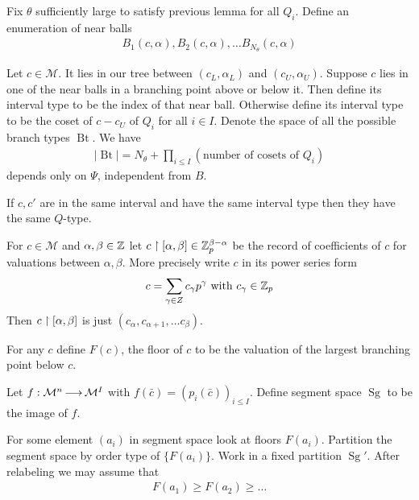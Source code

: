 \documentclass{amsart}
\newcommand{\M}{\mathcal M}
\newcommand{\paren}[1]{\left(#1\right)}
\DeclareMathOperator{\Sg}{Sg}
\DeclareMathOperator{\Bt}{Bt}
\begin{document}
\begin{Lemma}
	Fix $\theta$ sufficiently large to satisfy previous lemma for all $Q_i$. Define an enumeration of near balls
	\begin{align*}
		B_1(c, \alpha), B_2(c, \alpha), \ldots B_{N_\theta}(c, \alpha)
	\end{align*}
\end{Lemma}

\begin{Definition}
	Let $c \in \M$.
	It lies in our tree between $(c_L, \alpha_L)$ and $(c_U, \alpha_U)$.
	Suppose $c$ lies in one of the near balls in a branching point above or below it.
	Then define its interval type to be the index of that near ball.
	Otherwise define its interval type to be the coset of $c - c_U$ of $Q_i$ for all $i \in I$.
	Denote the space of all the possible branch types $\Bt$.
	We have
	\begin{align*}
		|\Bt| = N_\theta + \prod_{i \leq I} \paren{\text {number of cosets of $Q_i$}}
	\end{align*}
	depends only on $\Psi$, independent from $B$.
	
\end{Definition}

\begin{Lemma}
	If $c, c'$ are in the same interval and have the same interval type then they have the same $Q$-type.
\end{Lemma}

\begin{Definition}
	For $c \in \M$ and $\alpha, \beta \in \mathbb{Z}$ let $c \upharpoonright [\alpha, \beta] \in \mathbb{Z}_p^{\beta - \alpha}$ be the record of coefficients of $c$ for valuations between $\alpha, \beta$. More precisely write $c$ in its power series form
	\begin{align*}
		c = \sum_{\gamma \in Z} c_\gamma p^\gamma \text{ with } c_\gamma \in \mathbb{Z}_p
	\end{align*}
	Then $c \upharpoonright [\alpha, \beta]$ is just $(c_\alpha, c_{\alpha+1}, \ldots c_\beta)$.
\end{Definition}

For any $c$ define $F(c)$, the floor of $c$ to be the valuation of the largest branching point below $c$.

Let $f: \M^n \arr \M^I$ with $f(\bar c) = (p_i(\bar c))_{i \leq I}$.
Define segment space $\Sg$ to be the image of $f$.

For some element $(a_i)$ in segment space look at floors $F(a_i)$.
Partition the segment space by order type of $\{F(a_i)\}$.
Work in a fixed partition $\Sg'$.
After relabeling we may assume that
\begin{align*}
	F(a_1) \geq F(a_2) \geq \ldots 
\end{align*}
\end{document}
